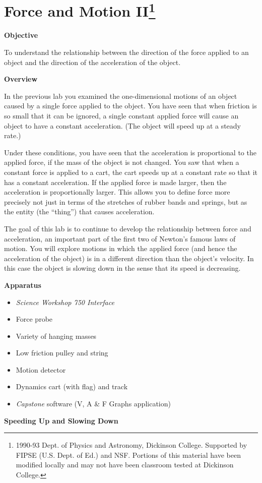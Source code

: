 
\section{Force and Motion II\footnote{
1990-93 Dept. of Physics and Astronomy, Dickinson College. Supported by FIPSE
(U.S. Dept. of Ed.) and NSF. Portions of this material have been modified locally
and may not have been classroom tested at Dickinson College.
}}

\makelabheader %

\textbf{Objective} 

To understand the relationship between the direction of the force applied to
an object and the direction of the acceleration of the object. 

\textbf{Overview} 

In the previous lab you examined the one-dimensional motions of an object caused
by a single force applied to the object. You have seen that when friction is
so small that it can be ignored, a single constant applied force will cause
an object to have a constant acceleration. (The object will speed up at a steady
rate.) 

Under these conditions, you have seen that the acceleration is proportional
to the applied force, if the mass of the object is not changed. You saw that
when a constant force is applied to a cart, the cart speeds up at a constant
rate so that it has a constant acceleration. If the applied force is made larger,
then the acceleration is proportionally larger. This allows you to define force
more precisely not just in terms of the stretches of rubber bands and springs,
but as the entity (the ``thing'') that causes acceleration.

The goal of this lab is to continue to develop the relationship between force
and acceleration, an important part of the first two of Newton's famous laws
of motion. You will explore motions in which the applied force (and hence the
acceleration of the object) is in a different direction than the object's velocity.
In this case the object is slowing down in the sense that its speed is decreasing.

\textbf{Apparatus }

\begin{itemize}
\item \textit{Science Workshop 750 Interface}
\item Force probe 
\item Variety of hanging masses 
\item Low friction pulley and string 
\item Motion detector 
\item Dynamics cart (with flag) and track 
\item \textit{Capstone} software (V, A \& F Graphs application)
\end{itemize}
\textbf{Speeding Up and Slowing Down }

